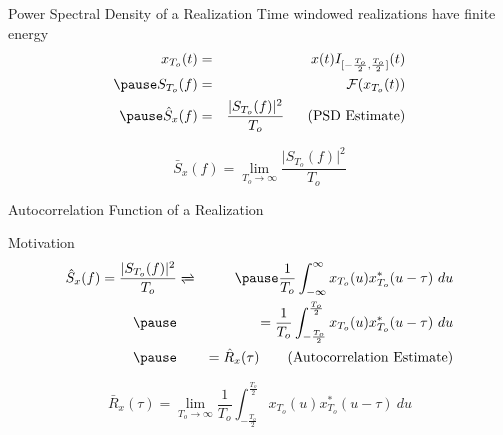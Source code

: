 \documentclass[t]{beamer}
\begin{document}
\begin{frame}{Power Spectral Density of a Realization}
  \footnotesize
    Time windowed realizations have finite energy
    \begin{eqnarray*}
      x_{T_o}(t) & = & x(t)I_{[-\frac{T_o}{2},\frac{T_o}{2}]}(t) \\
      \pause
      S_{T_o}(f) & = & \mathcal{F}(x_{T_o}(t)) \\
      \pause
      \hat{S}_x(f) & = & \frac{\lvert S_{T_o}(f) \rvert^2}{T_o} \ \ \ \ \text{ (PSD Estimate)}
    \end{eqnarray*}
  \pause
  \begin{definition}
    \begin{equation*}
    \bar{S}_x(f) = \lim_{T_o \rightarrow \infty} \frac{\lvert S_{T_o}(f) \rvert^2}{T_o}
    \end{equation*}
  \end{definition}
  \normalsize
\end{frame}

\begin{frame}{Autocorrelation Function of a Realization}
  \footnotesize
  \pause
  \begin{block}{Motivation}
    \begin{eqnarray*}
     \hat{S}_x(f)  =  \frac{\lvert S_{T_o}(f) \rvert^2}{T_o} & \xrightleftharpoons{} & \pause\frac{1}{T_o} \int_{-\infty}^{\infty} x_{T_o}(u)x_{T_o}^*(u-\tau) \ du \\
     \pause
     &  & =  \frac{1}{T_o} \int_{-\frac{T_o}{2}}^{\frac{T_o}{2}} x_{T_o}(u)x_{T_o}^*(u-\tau) \ du \\
     \pause
     &  & = \hat{R}_x(\tau) \ \ \ \ \ \ \text{(Autocorrelation Estimate)}
    \end{eqnarray*}
  \end{block}
  \pause
  \begin{definition}
    \begin{equation*}
      \bar{R}_x(\tau) = \lim_{T_o \rightarrow \infty} \frac{1}{T_o} \int_{-\frac{T_o}{2}}^{\frac{T_o}{2}} x_{T_o}(u)x_{T_o}^*(u-\tau) \ du 
    \end{equation*}
  \end{definition}
  \normalsize
\end{frame}
\end{document}
